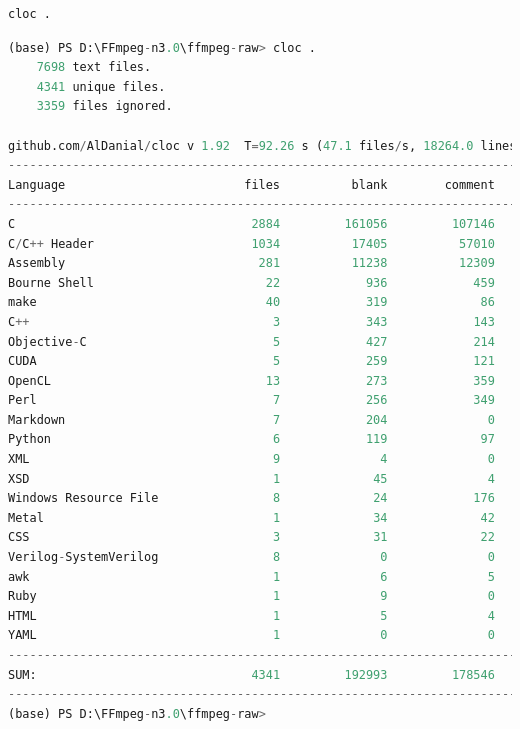 \documentclass[10pt,UTF8]{ctexart}
\begin{document}
\begin{lstlisting}[language={python}]
cloc .
\end{lstlisting}

\begin{lstlisting}[language={python}]
(base) PS D:\FFmpeg-n3.0\ffmpeg-raw> cloc .
    7698 text files.
    4341 unique files.
    3359 files ignored.

github.com/AlDanial/cloc v 1.92  T=92.26 s (47.1 files/s, 18264.0 lines/s)
-----------------------------------------------------------------------------------
Language                         files          blank        comment           code
-----------------------------------------------------------------------------------
C                                 2884         161056         107146        1068012
C/C++ Header                      1034          17405          57010         121608
Assembly                           281          11238          12309         100291
Bourne Shell                        22            936            459           8150
make                                40            319             86           4370
C++                                  3            343            143           2206
Objective-C                          5            427            214           2092
CUDA                                 5            259            121           1399
OpenCL                              13            273            359           1349
Perl                                 7            256            349           1050
Markdown                             7            204              0            868
Python                               6            119             97            577
XML                                  9              4              0            432
XSD                                  1             45              4            337
Windows Resource File                8             24            176            240
Metal                                1             34             42            202
CSS                                  3             31             22            140
Verilog-SystemVerilog                8              0              0             56
awk                                  1              6              5             53
Ruby                                 1              9              0             52
HTML                                 1              5              4             44
YAML                                 1              0              0             30
-----------------------------------------------------------------------------------
SUM:                              4341         192993         178546        1313558
-----------------------------------------------------------------------------------
(base) PS D:\FFmpeg-n3.0\ffmpeg-raw>
\end{lstlisting}
\end{document}
